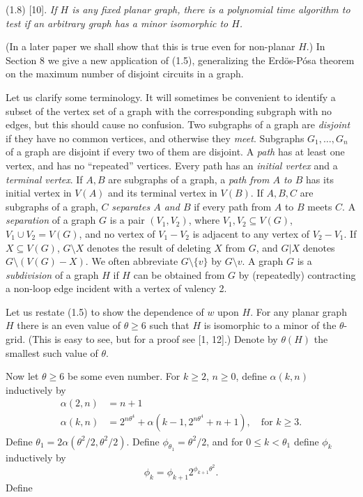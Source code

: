 \stmt
(1.8) [10]. \textit{If $H$ is any fixed planar graph, there is a polynomial time algorithm to test if an arbitrary graph has a minor isomorphic to $H$.}

(In a later paper we shall show that this is true even for non-planar $H$.) In Section 8 we give a new application of (1.5), generalizing the Erd\"os-P\'osa theorem on the maximum number of disjoint circuits in a graph.

Let us clarify some terminology. It will sometimes be convenient to identify a subset of the vertex set of a graph with the corresponding subgraph with no edges, but this should cause no confusion. Two subgraphs of a graph are \textit{disjoint} if they have no common vertices, and otherwise they \textit{meet}. Subgraphs $G_1, \ldots, G_n$ of a graph are disjoint if every two of them are disjoint. A \textit{path} has at least one vertex, and has no ``repeated'' vertices. Every path has an \textit{initial vertex} and a \textit{terminal vertex}. If $A, B$ are subgraphs of a graph, a \textit{path from $A$ to $B$} has its initial vertex in $V(A)$ and its terminal vertex in $V(B)$. If $A, B, C$ are subgraphs of a graph, $C$ \textit{separates $A$ and $B$} if every path from $A$ to $B$ meets $C$. A \textit{separation} of a graph $G$ is a pair $(V_1, V_2)$, where $V_1, V_2 \subseteq V(G)$, $V_1 \cup V_2 = V(G)$, and no vertex of $V_1 - V_2$ is adjacent to any vertex of $V_2 - V_1$. If $X \subseteq V(G)$, $G \setminus X$ denotes the result of deleting $X$ from $G$, and $G | X$ denotes $G \setminus (V(G) - X)$. We often abbreviate $G \setminus \{v\}$ by $G \setminus v$. A graph $G$ is a \textit{subdivision} of a graph $H$ if $H$ can be obtained from $G$ by (repeatedly) contracting a non-loop edge incident with a vertex of valency 2.


Let us restate (1.5) to show the dependence of $w$ upon $H$. For any planar graph $H$ there is an even value of $\theta \ge 6$ such that $H$ is isomorphic to a minor of the $\theta$-grid. (This is easy to see, but for a proof see [1, 12].) Denote by $\theta(H)$ the smallest such value of $\theta$.

Now let $\theta \ge 6$ be some even number. For $k \ge 2$, $n \ge 0$, define $\alpha(k, n)$ inductively by
\begin{align*}
\alpha(2, n) &= n + 1 \\
\alpha(k, n) &= 2^{n\theta^4} + \alpha(k - 1, 2^{n\theta^4} + n + 1), \quad \text{for } k \ge 3.
\end{align*}
Define $\theta_1 = 2\alpha(\theta^2/2, \theta^2/2)$. Define $\phi_{\theta_1} = \theta^2/2$, and for $0 \le k < \theta_1$ define $\phi_k$ inductively by
\begin{equation*}
\phi_k = \phi_{k+1} 2^{\phi_{k+1} \theta^2}.
\end{equation*}
Define
